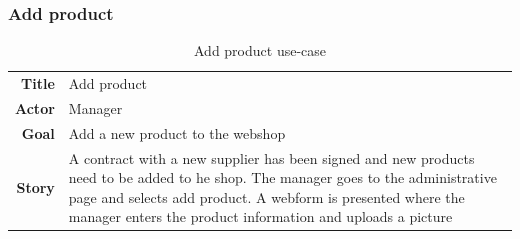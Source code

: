 \documentclass[12pt, a4paper,titlepage]{article}
\begin{document}
\subsubsection{Add product}
\begin{table}[H]
\centering
\begin{tabular}{r | p{12cm}}
\textbf{Title} & Add product \\
\textbf{Actor} & Manager \\
\textbf{Goal} & Add a new product to the webshop \\
\textbf{Story} & A contract with a new supplier has been signed and new products need to be added to he shop. The manager goes to the administrative page and selects add product. A webform is presented where the manager enters the product information and uploads a picture \\
\end{tabular}
\caption{Add product use-case}
\end{table}
\end{document}
